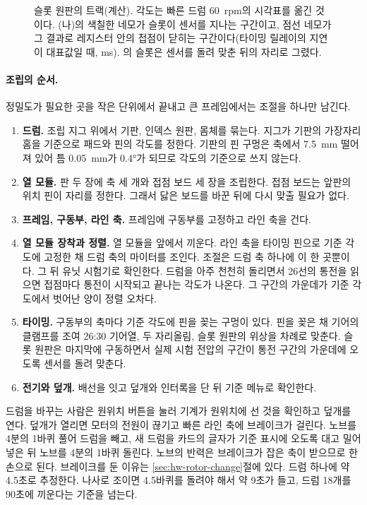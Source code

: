 \begin{figure}[ht]
\centering

\caption{슬롯 원판의 트랙(계산). 각도는 빠른 드럼 60~rpm의 시각표를 옮긴 것이다. (나)의 색칠한 네모가 슬롯이
센서를 지나는 구간이고, 점선 네모가 그 결과로 레지스터 안의 접점이 닫히는 구간이다(타이밍 릴레이의 지연이
대표값일 때, ms). 의 슬롯은 센서를 돌려 맞춘 뒤의 자리로 그렸다.}
\label{fig:hw-gear-dim-slotdisc}
\end{figure}

\paragraph{조립의 순서.} 정밀도가 필요한 곳을 작은 단위에서 끝내고 큰 프레임에서는 조절을 하나만 남긴다.

\begin{enumerate}
\item \textbf{드럼.} 조립 지그 위에서 기판, 인덱스 원판, 몸체를 묶는다. 지그가 기판의 가장자리 홈을 기준으로
패드와 핀의 각도를 정한다. 기판의 핀 구멍은 축에서 7.5~mm 떨어져 있어 틈 0.05~mm가 0.4°가 되므로 각도의
기준으로 쓰지 않는다.
\item \textbf{열 모듈.} 판 두 장에 축 세 개와 접점 보드 세 장을 조립한다. 접점 보드는 앞판의 위치 핀이 자리를
정한다. 그래서 닳은 보드를 바꾼 뒤에 다시 맞출 필요가 없다.
\item \textbf{프레임, 구동부, 라인 축.} 프레임에 구동부를 고정하고 라인 축을 건다.
\item \textbf{열 모듈 장착과 정렬.} 열 모듈을 앞에서 끼운다. 라인 축을 타이밍 핀으로 기준 각도에 고정한 채
드럼 축의 마이터를 조인다. 조절은 드럼 축 하나에 이 한 곳뿐이다. 그 뒤 유닛 시험기로 확인한다. 드럼을 아주
천천히 돌리면서 26선의 통전을 읽으면 접점마다 통전이 시작되고 끝나는 각도가 나온다. 그 구간의 가운데가 기준
각도에서 벗어난 양이 정렬 오차다.
\item \textbf{타이밍.} 구동부의 축마다 기준 각도에 핀을 꽂는 구멍이 있다. 핀을 꽂은 채 기어의 클램프를 조여
26:30 기어열, 두 자리올림, 슬롯 원판의 위상을 차례로 맞춘다. 슬롯 원판은 마지막에 구동하면서 실제 시험
전압의 구간이 통전 구간의 가운데에 오도록 센서를 돌려 맞춘다.
\item \textbf{전기와 덮개.} 배선을 잇고 덮개와 인터록을 단 뒤 기준 메뉴로 확인한다.
\end{enumerate}

드럼을 바꾸는 사람은 원위치 버튼을 눌러 기계가 원위치에 선 것을 확인하고 덮개를 연다. 덮개가 열리면 모터의
전원이 끊기고 빠른 라인 축에 브레이크가 걸린다. 노브를 4분의 1바퀴 풀어 드럼을 빼고, 새 드럼을 카드의 글자가 기준 표시에
오도록 대고 밀어 넣은 뒤 노브를 4분의 1바퀴 돌린다. 노브의 반력은 브레이크가 잡은 축이 받으므로 한 손으로 된다.
브레이크를 둔 이유는 \ref{sec:hw-rotor-change}절에 있다. 드럼 하나에 약 4.5초로 추정한다. 나사로 조이면 4.5바퀴를
돌려야 해서 약 9초가 들고, 드럼 18개를 90초에 끼운다는 기준을 넘는다.

